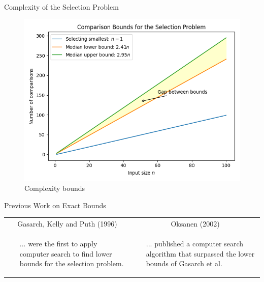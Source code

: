 \begin{frame}{Complexity of the Selection Problem}
  \begin{figure}
    \includegraphics[height=0.65\textheight]{figures/bounds_diagram.png}
    \caption{Complexity bounds}
  \end{figure}
\end{frame}

\begin{frame}{Previous Work on Exact Bounds}
  \begin{tabular}{|p{6cm}|p{6cm}|}
    \hline
    \multicolumn{1}{|c|}{Gasarch, Kelly and Puth (1996)}                                                                  & \multicolumn{1}{c|}{Oksanen (2002)} \\
    \cline{1-2}
    \raggedright \begin{itemize}
                   \item [...]were the first to apply computer search to find lower bounds for the selection problem.
                 \end{itemize} &
    \begin{itemize}
      \item[...] published a computer search algorithm that surpassed the lower bounds of Gasarch et al.
    \end{itemize}                                             \\
    \cline{1-2}
  \end{tabular}

\end{frame}

